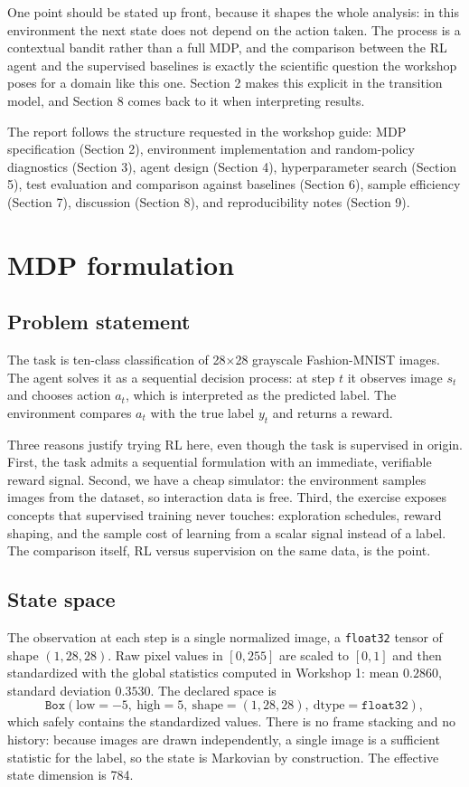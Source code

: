 \documentclass[11pt,a4paper]{article}
\begin{document}
One point should be stated up front, because it shapes the whole analysis: in this environment the next state does not depend on the action taken. The process is a contextual bandit rather than a full MDP, and the comparison between the RL agent and the supervised baselines is exactly the scientific question the workshop poses for a domain like this one. Section 2 makes this explicit in the transition model, and Section 8 comes back to it when interpreting results.

The report follows the structure requested in the workshop guide: MDP specification (Section 2), environment implementation and random-policy diagnostics (Section 3), agent design (Section 4), hyperparameter search (Section 5), test evaluation and comparison against baselines (Section 6), sample efficiency (Section 7), discussion (Section 8), and reproducibility notes (Section 9).

\section{MDP formulation}

\subsection{Problem statement}

The task is ten-class classification of 28$\times$28 grayscale Fashion-MNIST images. The agent solves it as a sequential decision process: at step $t$ it observes image $s_t$ and chooses action $a_t$, which is interpreted as the predicted label. The environment compares $a_t$ with the true label $y_t$ and returns a reward.

Three reasons justify trying RL here, even though the task is supervised in origin. First, the task admits a sequential formulation with an immediate, verifiable reward signal. Second, we have a cheap simulator: the environment samples images from the dataset, so interaction data is free. Third, the exercise exposes concepts that supervised training never touches: exploration schedules, reward shaping, and the sample cost of learning from a scalar signal instead of a label. The comparison itself, RL versus supervision on the same data, is the point.

\subsection{State space}

The observation at each step is a single normalized image, a \texttt{float32} tensor of shape $(1, 28, 28)$. Raw pixel values in $[0,255]$ are scaled to $[0,1]$ and then standardized with the global statistics computed in Workshop 1: mean $0.2860$, standard deviation $0.3530$. The declared space is
\[
\texttt{Box}(\text{low}=-5,\ \text{high}=5,\ \text{shape}=(1,28,28),\ \text{dtype}=\texttt{float32}),
\]
which safely contains the standardized values. There is no frame stacking and no history: because images are drawn independently, a single image is a sufficient statistic for the label, so the state is Markovian by construction. The effective state dimension is 784.
\end{document}
